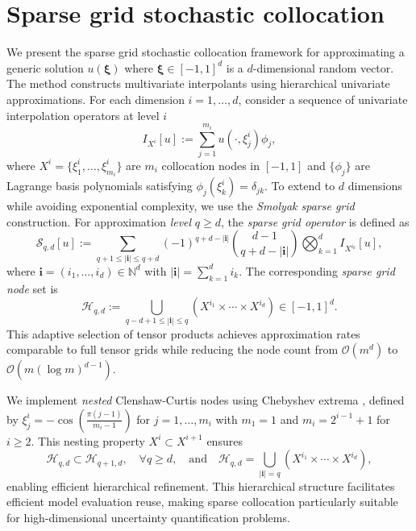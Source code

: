 \section{Sparse grid stochastic collocation}\label{sec:SC}
We present the sparse grid stochastic collocation framework \cite{BaNoRi:2000, KlBa:2005, MaNi:2009, Sm:1963} for approximating a generic solution $u(\boldsymbol{\xi})$ where $\boldsymbol{\xi} \in [-1,1]^d$ is a $d$-dimensional random vector. The method constructs multivariate interpolants using hierarchical univariate approximations. For each dimension $i=1,\ldots,d$, consider a sequence of univariate interpolation operators at level $i$
%
\[
I_{X^{i}}[u]:=\sum_{j=1}^{m_{i}} u(\cdot, \xi_j^i)\phi_j,
\]
%
where $X^i = \{\xi_1^i,\ldots, \xi_{m_i}^i\}$ are $m_i$ collocation nodes in $[-1,1]$ and $\{\phi_j\}$ are Lagrange basis polynomials satisfying  $\phi_j(\xi_k^i) = \delta_{jk}$. To extend to $d$ dimensions while avoiding exponential complexity, we use the {\it Smolyak sparse grid} construction. For approximation {\it level} $q \geq d$, the {\it sparse grid operator} is defined as
%
\begin{equation}\label{eq: Smolyak_Quad_formula}
\mathcal{S}_{q,d}[u] := \sum_{q+1 \leq |\boldsymbol{i}| \leq q+d} (-1)^{q+d-|\boldsymbol{i}|} \binom{d-1}{q+d-|\boldsymbol{i}|} \bigotimes_{k=1}^d I_{X^{i_k}}[u],
\end{equation}
%
where $\boldsymbol{i} = (i_1,\ldots,i_d) \in \mathbb{N}^d$ with $|\boldsymbol{i}| = \sum_{k=1}^d i_k$. The corresponding {\it sparse grid node} set is
%
\begin{equation}\label{eq:sparse_grid_nodes}
\mathcal{H}_{q,d} := \bigcup_{q-d+1 \leq |\boldsymbol{i}| \leq q} \left( X^{i_1} \times \cdots \times X^{i_d} \right)\in [-1,1]^d.
\end{equation}
%
This adaptive selection of tensor products achieves approximation rates comparable to full tensor grids while reducing the node count from $\mathcal{O}(m^d)$ to $\mathcal{O}(m (\log m)^{d-1})$.

We implement \textit{nested} Clenshaw-Curtis nodes using Chebyshev extrema \cite{BaNoRi:2000, ClCu:1960}, defined by $\xi_j^i=-\cos(\frac{ \pi(j-1)}{m_i-1})$ for $j=1, \ldots, m_i$ with $m_1 =1$ and $m_i = 2^{i-1}+1$ for $i\ge 2$. This nesting property  $X^i\subset X^{i+1}$ ensures
%
\begin{equation}\label{eq:nested_grids}
\mathcal{H}_{q,d} \subset \mathcal{H}_{q+1,d}, \quad \forall q \geq d, \quad \text{and}\quad \mathcal{H}_{q,d} = \bigcup_{|\boldsymbol{i}|=q} \left(X^{i_1}\times \cdots\times X^{i_d}\right),
\end{equation}
%
enabling efficient hierarchical refinement. This hierarchical structure facilitates efficient model evaluation reuse, making sparse collocation particularly suitable for high-dimensional uncertainty quantification problems.



